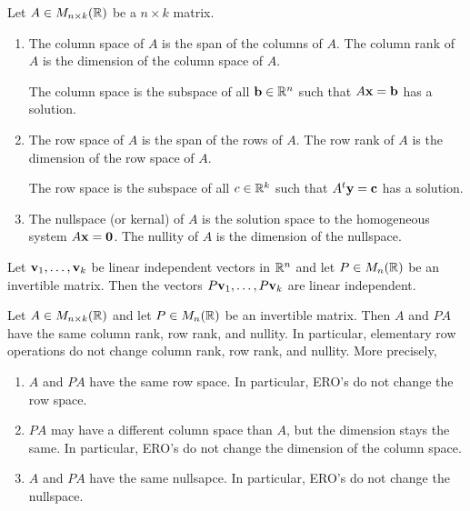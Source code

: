 \documentclass[10pt, a4paper]{article}
\begin{document}
\begin{definition}
    Let $A \in M_{n \times k}(\mathbb{R})$ be a $n \times k$ matrix.
    \begin{enumerate}[label = (\roman*)]
        \item The column space of $A$ is the span of the columns of $A$.
        The column rank of $A$ is the dimension of the column space of $A$.

        The column space is the subspace of all $\mathbf{b} \in \mathbb{R} ^ n$ such that $A\mathbf{x} = \mathbf{b}$ has a solution.

        \item The row space of $A$ is the span of the rows of $A$.
        The row rank of $A$ is the dimension of the row space of $A$.

        The row space is the subspace of all $c \in \mathbb{R} ^ k$ such that $A ^ t\mathbf{y} = \mathbf{c}$ has a solution.

        \item The nullspace
        (or kernal)
        of $A$ is the solution space to the homogeneous system $A\mathbf{x} = \mathbf{0}$.
        The nullity of $A$ is the dimension of the nullspace.
    \end{enumerate}
\end{definition}

\begin{lemma}\label{pre_linalg_lem_linindepvecmulmatrisindep}
    Let $\mathbf{v}_1, \dotsc, \mathbf{v}_k$ be linear independent vectors in $\mathbb{R} ^ n$ and let $P \in M_n(\mathbb{R})$ be an invertible matrix.
    Then the vectors $P\mathbf{v}_1, \dotsc,P\mathbf{v}_k$ are linear independent.
\end{lemma}

\begin{proposition}\label{pre_linalg_prop_invmatrsameranksandnul}
    Let $A \in M_{n \times k}(\mathbb{R})$ and let $P \in M_{n}(\mathbb{R})$ be an invertible matrix.
    Then $A$ and $PA$ have the same column rank,
    row rank,
    and nullity.
    In particular,
    elementary row operations do not change column rank,
    row rank,
    and nullity.
    More precisely,
    \begin{enumerate}
        \item $A$ and $PA$ have the same row space.
        In particular,
        ERO's do not change the row space.
        \item $PA$ may have a different column space than $A$,
        but the dimension stays the same.
        In particular,
        ERO's do not change the dimension of the column space.
        \item $A$ and $PA$ have the same nullsapce.
        In particular,
        ERO's do not change the nullspace.
    \end{enumerate}
\end{proposition}
\end{document}
